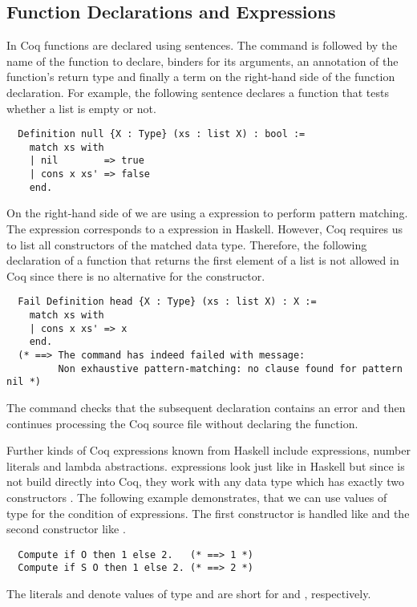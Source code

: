 \subsection{Function Declarations and Expressions} \label{sec:preliminaries:coq:func-decls}
In Coq functions are declared using  sentences.
The  command is followed by the name of the function to declare, binders for its arguments, an annotation of the function's return type and finally a term on the right-hand side of the function declaration.
For example, the following  sentence declares a function  that tests whether a list  is empty or not.
\begin{verbatim}
  Definition null {X : Type} (xs : list X) : bool :=
    match xs with
    | nil        => true
    | cons x xs' => false
    end.
\end{verbatim}
On the right-hand side of  we are using a  expression to perform pattern matching.
The  expression corresponds to a  expression in Haskell.
However, Coq requires us to list all constructors of the matched data type.
Therefore, the following declaration of a function that returns the first element of a list is not allowed in Coq since there is no alternative for the  constructor.
\begin{verbatim}
  Fail Definition head {X : Type} (xs : list X) : X :=
    match xs with
    | cons x xs' => x
    end.
  (* ==> The command has indeed failed with message:
         Non exhaustive pattern-matching: no clause found for pattern nil *)
\end{verbatim}
The  command checks that the subsequent declaration contains an error and then continues processing the Coq source file without declaring the function.

Further kinds of Coq expressions known from Haskell include  expressions, number literals and lambda abstractions.
 expressions look just like in Haskell but since  is not build directly into Coq, they work with any data type which has exactly two constructors \cite[p.~48]{CoqDevTeam:2018}.
The following example demonstrates, that we can use values of type  for the condition of  expressions.
The first constructor  is handled like  and the second constructor  like .
\begin{verbatim}
  Compute if O then 1 else 2.   (* ==> 1 *)
  Compute if S O then 1 else 2. (* ==> 2 *)
\end{verbatim}
The literals  and  denote values of type  and are short for  and , respectively.

